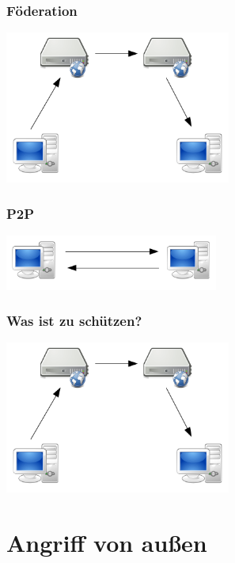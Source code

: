 \documentclass[12pt]{beamer}
\begin{document}
\begin{frame}
    \frametitle{Föderation}
    \begin{center}
      \includegraphics[height=5cm]{img/fed.png}
    \end{center}
\end{frame}

\begin{frame}
    \frametitle{P2P}
    \begin{center}
      \includegraphics[width=7cm]{img/direkt.png}
    \end{center}
\end{frame}

\begin{frame}
    \frametitle{Was ist zu schützen?}
    \begin{center}
      \includegraphics[height=5cm]{img/fed.png}
    \end{center}
\end{frame}

\section{Angriff von außen}
\subsection{}
\end{document}
